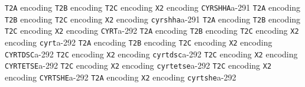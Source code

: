 \documentclass[twoside]{ltxdoc}
\makeatletter
\renewenvironment{theindex}{%
   \@restonecoltrue
   \if@twocolumn\@restonecolfalse\fi
   \columnseprule \z@
   \columnsep 35\p@
   \twocolumn[\index@prologue]%
   \IndexParms
   \let\item\@idxitem
   \ignorespaces
}{\if@restonecol\onecolumn\else\clearpage\fi}
\makeatother
\begin{document}
\begin{theindex}
    \subitem \texttt  {T2A} encoding\pfill {}
    \subitem \texttt  {T2B} encoding\pfill {}
    \subitem \texttt  {T2C} encoding\pfill {}
    \subitem \texttt  {X2} encoding\pfill {}
  \item \texttt  {CYRSHHA}\pfill a-291
    \subitem \texttt  {T2A} encoding\pfill {}
    \subitem \texttt  {T2B} encoding\pfill {}
    \subitem \texttt  {T2C} encoding\pfill {}
    \subitem \texttt  {X2} encoding\pfill {}
  \item \texttt  {cyrshha}\pfill a-291
    \subitem \texttt  {T2A} encoding\pfill {}
    \subitem \texttt  {T2B} encoding\pfill {}
    \subitem \texttt  {T2C} encoding\pfill {}
    \subitem \texttt  {X2} encoding\pfill {}
  \item \texttt  {CYRT}\pfill a-292
    \subitem \texttt  {T2A} encoding\pfill {}
    \subitem \texttt  {T2B} encoding\pfill {}
    \subitem \texttt  {T2C} encoding\pfill {}
    \subitem \texttt  {X2} encoding\pfill {}
  \item \texttt  {cyrt}\pfill a-292
    \subitem \texttt  {T2A} encoding\pfill {}
    \subitem \texttt  {T2B} encoding\pfill {}
    \subitem \texttt  {T2C} encoding\pfill {}
    \subitem \texttt  {X2} encoding\pfill {}
  \item \texttt  {CYRTDSC}\pfill a-292
    \subitem \texttt  {T2C} encoding\pfill {}
    \subitem \texttt  {X2} encoding\pfill {}
  \item \texttt  {cyrtdsc}\pfill a-292
    \subitem \texttt  {T2C} encoding\pfill {}
    \subitem \texttt  {X2} encoding\pfill {}
  \item \texttt  {CYRTETSE}\pfill a-292
    \subitem \texttt  {T2C} encoding\pfill {}
    \subitem \texttt  {X2} encoding\pfill {}
  \item \texttt  {cyrtetse}\pfill a-292
    \subitem \texttt  {T2C} encoding\pfill {}
    \subitem \texttt  {X2} encoding\pfill {}
  \item \texttt  {CYRTSHE}\pfill a-292
    \subitem \texttt  {T2A} encoding\pfill {}
    \subitem \texttt  {X2} encoding\pfill {}
  \item \texttt  {cyrtshe}\pfill a-292

\end{theindex}
\end{document}
